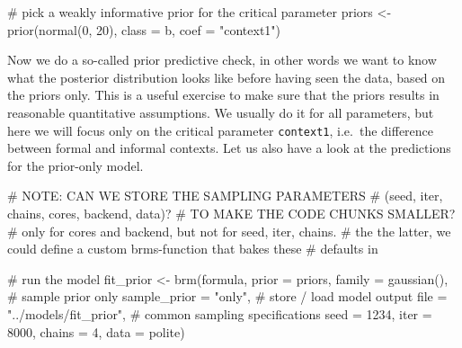 \documentclass[
  doc,
  floatsintext,
  longtable,
  nolmodern,
  notxfonts,
  notimes,
  colorlinks=true,linkcolor=blue,citecolor=blue,urlcolor=blue]{apa7}
\newenvironment{Shaded}{\begin{snugshade}}{\end{snugshade}}
\newcommand{\AlertTok}[1]{\textcolor[rgb]{0.68,0.00,0.00}{#1}}
\newcommand{\AttributeTok}[1]{\textcolor[rgb]{0.40,0.45,0.13}{#1}}
\newcommand{\CommentTok}[1]{\textcolor[rgb]{0.37,0.37,0.37}{#1}}
\newcommand{\DecValTok}[1]{\textcolor[rgb]{0.68,0.00,0.00}{#1}}
\newcommand{\FunctionTok}[1]{\textcolor[rgb]{0.28,0.35,0.67}{#1}}
\newcommand{\NormalTok}[1]{\textcolor[rgb]{0.00,0.23,0.31}{#1}}
\newcommand{\OtherTok}[1]{\textcolor[rgb]{0.00,0.23,0.31}{#1}}
\newcommand{\StringTok}[1]{\textcolor[rgb]{0.13,0.47,0.30}{#1}}
\begin{document}
\begin{Shaded}
\begin{Highlighting}[]
\CommentTok{\# pick a weakly informative prior for the critical parameter}
\NormalTok{priors }\OtherTok{\textless{}{-}} \FunctionTok{prior}\NormalTok{(}\FunctionTok{normal}\NormalTok{(}\DecValTok{0}\NormalTok{, }\DecValTok{20}\NormalTok{), }
                \AttributeTok{class =}\NormalTok{ b, }
                \AttributeTok{coef =} \StringTok{"context1"}\NormalTok{)}
\end{Highlighting}
\end{Shaded}

Now we do a so-called prior predictive check, in other words we want to
know what the posterior distribution looks like before having seen the
data, based on the priors only. This is a useful exercise to make sure
that the priors results in reasonable quantitative assumptions. We
usually do it for all parameters, but here we will focus only on the
critical parameter \texttt{context1}, i.e.~the difference between formal
and informal contexts. Let us also have a look at the predictions for
the prior-only model.

\begin{Shaded}
\begin{Highlighting}[]
\CommentTok{\# }\AlertTok{NOTE}\CommentTok{: CAN WE STORE THE SAMPLING PARAMETERS }
\CommentTok{\#       (seed, iter, chains, cores, backend, data)? }
\CommentTok{\#       TO MAKE THE CODE CHUNKS SMALLER?}
\CommentTok{\# only for \textquotesingle{}cores\textquotesingle{} and \textquotesingle{}backend\textquotesingle{}, but not for seed, iter, chains.}
\CommentTok{\# the the latter, we could define a custom brms{-}function that bakes these}
\CommentTok{\# defaults in}


\CommentTok{\# run the model}
\NormalTok{fit\_prior }\OtherTok{\textless{}{-}} \FunctionTok{brm}\NormalTok{(formula,}
           \AttributeTok{prior =}\NormalTok{ priors,}
           \AttributeTok{family =} \FunctionTok{gaussian}\NormalTok{(),}
           \CommentTok{\# sample prior only}
           \AttributeTok{sample\_prior =} \StringTok{"only"}\NormalTok{,}
           \CommentTok{\# store / load model output}
           \AttributeTok{file  =} \StringTok{"../models/fit\_prior"}\NormalTok{,}
           \CommentTok{\# common sampling specifications}
           \AttributeTok{seed =} \DecValTok{1234}\NormalTok{,}
           \AttributeTok{iter =} \DecValTok{8000}\NormalTok{,}
           \AttributeTok{chains =} \DecValTok{4}\NormalTok{,}
           \AttributeTok{data =}\NormalTok{ polite)}
\end{Highlighting}
\end{Shaded}
\end{document}
